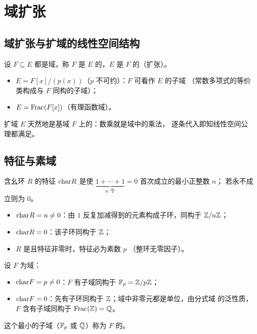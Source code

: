 \section{域扩张}\label{sec:extensions}

\subsection{域扩张与扩域的线性空间结构}

\begin{definition}
设 $F\subseteq E$ 都是域，称 $F$ 是 $E$ 的，$E$ 是 $F$
的（扩张）。
\end{definition}

\begin{example}
\leavevmode
\begin{itemize}[leftmargin=1.3em,itemsep=1pt]
  \item $E = F[x]/(p(x))$（$p$ 不可约）：$F$ 可看作 $E$ 的子域
        （常数多项式的等价类构成与 $F$ 同构的子域）；
  \item $E = \mathrm{Frac}(F[x])$（有理函数域）。
\end{itemize}
\end{example}

\begin{remark}[扩域的线性空间结构]
扩域 $E$ 天然地是基域 $F$ 上的：数乘就是域中的乘法，
逐条代入即知线性空间公理都满足。
\end{remark}

\subsection{特征与素域}

含幺环 $R$ 的特征 $\mathrm{char} R$ 是使
$\underbrace{1+\cdots+1}_{n\text{ 个}} = 0$ 首次成立的最小正整数 $n$；
若永不成立则为 $0$。
\begin{itemize}[leftmargin=1.3em,itemsep=2pt]
  \item $\mathrm{char} R = n\ne 0$：由 $1$ 反复加减得到的元素构成子环，同构于
        $\mathbb{Z}/n\mathbb{Z}$；
  \item $\mathrm{char} R = 0$：该子环同构于 $\mathbb{Z}$；
  \item $R$ 是且特征非零时，特征必为素数 $p$
        （整环无零因子）。
\end{itemize}

设 $F$ 为域：
\begin{itemize}[leftmargin=1.3em,itemsep=2pt]
  \item $\mathrm{char} F = p\ne 0$：$F$ 有子域同构于 $\mathbb{F}_p = \mathbb{Z}/p\mathbb{Z}$；
  \item $\mathrm{char} F = 0$：先有子环同构于 $\mathbb{Z}$；域中非零元都是单位，由分式域
        的泛性质，$F$ 含有子域同构于 $\mathrm{Frac}(\mathbb{Z}) = \mathbb{Q}$。
\end{itemize}
这个最小的子域（$\mathbb{F}_p$ 或 $\mathbb{Q}$）称为 $F$ 的。

